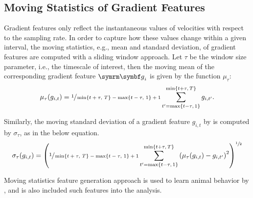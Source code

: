 \subsection{Moving Statistics of Gradient Features}
Gradient features only reflect the instantaneous values of velocities with respect to the sampling rate.
In order to capture how these values change within a given interval, the moving statistics, e.g., mean and standard deviation, of gradient features are computed with a sliding window approach.
Let $\tau$ be the window size parameter, i.e., the timescale of interest, then the moving mean of the corresponding gradient feature $\V{g}_{i}$ is given by the function $\mu_\tau$:
\begin{equation}
	\mu_{\tau}(g_{i,t}) = \sfrac{1}{\min\{t+\tau,\, T\}-\max\{t-\tau,\, 1\}+1} \sum_{t^{\prime}=\max\{t-\tau,\, 1\}}^{\min\{t+\tau,\, T\}} g_{i, t^{\prime}}.
\end{equation}

Similarly, the moving standard deviation of a gradient feature $g_{i,t}$ by is computed by $\sigma_\tau$, as in the below equation.
\begin{equation}
	\sigma_\tau(g_{i,t}) = \left(\sfrac{1}{\min\{t+\tau,\, T\}-\max\{t-\tau,\, 1\}+1} \sum_{t^{\prime}=\max\{t-\tau,\, 1\}}^{\min\{t+\tau,\, T\}} \left(\mu_{\tau}(g_{i,t}) - g_{i, t^{\prime}}\right)^2\right)^{\sfrac{1}{2}}
\end{equation}

Moving statistics feature generation approach is used to learn animal behavior by \citet{kabra_jaaba_2013}, and \citet{marshall_continuous_2021} is also included such features into the analysis.

